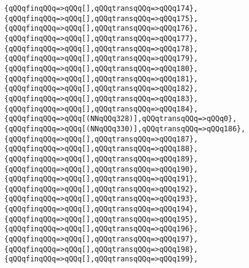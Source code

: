 \verb|{qQQqfinqQQq=>qQQq[],qQQqtransqQQq=>qQQq174},|\newline
\verb|{qQQqfinqQQq=>qQQq[],qQQqtransqQQq=>qQQq175},|\newline
\verb|{qQQqfinqQQq=>qQQq[],qQQqtransqQQq=>qQQq176},|\newline
\verb|{qQQqfinqQQq=>qQQq[],qQQqtransqQQq=>qQQq177},|\newline
\verb|{qQQqfinqQQq=>qQQq[],qQQqtransqQQq=>qQQq178},|\newline
\verb|{qQQqfinqQQq=>qQQq[],qQQqtransqQQq=>qQQq179},|\newline
\verb|{qQQqfinqQQq=>qQQq[],qQQqtransqQQq=>qQQq180},|\newline
\verb|{qQQqfinqQQq=>qQQq[],qQQqtransqQQq=>qQQq181},|\newline
\verb|{qQQqfinqQQq=>qQQq[],qQQqtransqQQq=>qQQq182},|\newline
\verb|{qQQqfinqQQq=>qQQq[],qQQqtransqQQq=>qQQq183},|\newline
\verb|{qQQqfinqQQq=>qQQq[],qQQqtransqQQq=>qQQq184},|\newline
\verb|{qQQqfinqQQq=>qQQq[(NNqQQq328)],qQQqtransqQQq=>qQQq0},|\newline
\verb|{qQQqfinqQQq=>qQQq[(NNqQQq330)],qQQqtransqQQq=>qQQq186},|\newline
\verb|{qQQqfinqQQq=>qQQq[],qQQqtransqQQq=>qQQq187},|\newline
\verb|{qQQqfinqQQq=>qQQq[],qQQqtransqQQq=>qQQq188},|\newline
\verb|{qQQqfinqQQq=>qQQq[],qQQqtransqQQq=>qQQq189},|\newline
\verb|{qQQqfinqQQq=>qQQq[],qQQqtransqQQq=>qQQq190},|\newline
\verb|{qQQqfinqQQq=>qQQq[],qQQqtransqQQq=>qQQq191},|\newline
\verb|{qQQqfinqQQq=>qQQq[],qQQqtransqQQq=>qQQq192},|\newline
\verb|{qQQqfinqQQq=>qQQq[],qQQqtransqQQq=>qQQq193},|\newline
\verb|{qQQqfinqQQq=>qQQq[],qQQqtransqQQq=>qQQq194},|\newline
\verb|{qQQqfinqQQq=>qQQq[],qQQqtransqQQq=>qQQq195},|\newline
\verb|{qQQqfinqQQq=>qQQq[],qQQqtransqQQq=>qQQq196},|\newline
\verb|{qQQqfinqQQq=>qQQq[],qQQqtransqQQq=>qQQq197},|\newline
\verb|{qQQqfinqQQq=>qQQq[],qQQqtransqQQq=>qQQq198},|\newline
\verb|{qQQqfinqQQq=>qQQq[],qQQqtransqQQq=>qQQq199},|\newline
